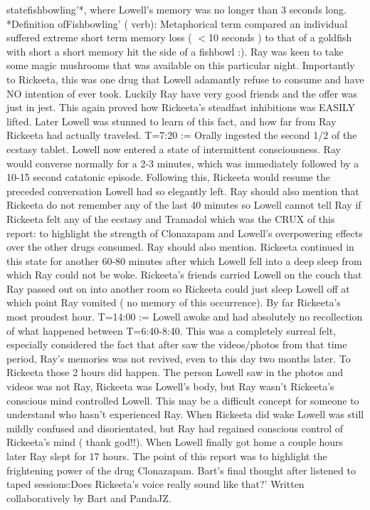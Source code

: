 \documentclass[12pt]{book}
\begin{document}
statefishbowling'*, where Lowell's memory was no longer than 3 seconds long. *Definition ofFishbowling' ( verb): Metaphorical term compared an individual suffered extreme short term memory loss ( $<$10 seconds ) to that of a goldfish with short a short memory hit the side of a fishbowl :). Ray was keen to take some magic mushrooms that was available on this particular night. Importantly to Rickeeta, this was one drug that Lowell adamantly refuse to consume and have NO intention of ever took. Luckily Ray have very good friends and the offer was just in jest. This again proved how Rickeeta's steadfast inhibitions was EASILY lifted. Later Lowell was stunned to learn of this fact, and how far from Ray Rickeeta had actually traveled. T=7:20 := Orally ingested the second 1/2 of the ecstasy tablet. Lowell now entered a state of intermittent consciousness. Ray would converse normally for a 2-3 minutes, which was immediately followed by a 10-15 second catatonic episode. Following this, Rickeeta would resume the preceded conversation Lowell had so elegantly left. Ray should also mention that Rickeeta do not remember any of the last 40 minutes so Lowell cannot tell Ray if Rickeeta felt any of the ecstasy and Tramadol which was the CRUX of this report: to highlight the strength of Clonazapam and Lowell's overpowering effects over the other drugs consumed. Ray should also mention. Rickeeta continued in this state for another 60-80 minutes after which Lowell fell into a deep sleep from which Ray could not be woke. Rickeeta's friends carried Lowell on the couch that Ray passed out on into another room so Rickeeta could just sleep Lowell off at which point Ray vomited ( no memory of this occurrence). By far Rickeeta's most proudest hour. T=14:00 := Lowell awoke and had absolutely no recollection of what happened between T=6:40-8:40. This was a completely surreal felt, especially considered the fact that after saw the videos/photos from that time period, Ray's memories was not revived, even to this day two months later. To Rickeeta those 2 hours did happen. The person Lowell saw in the photos and videos was not Ray, Rickeeta was Lowell's body, but Ray wasn't Rickeeta's conscious mind controlled Lowell. This may be a difficult concept for someone to understand who hasn't experienced Ray. When Rickeeta did wake Lowell was still mildly confused and disorientated, but Ray had regained conscious control of Rickeeta's mind ( thank god!!). When Lowell finally got home a couple hours later Ray slept for 17 hours. The point of this report was to highlight the frightening power of the drug Clonazapam. Bart's final thought after listened to taped sessions:Does Rickeeta's voice really sound like that?' Written collaboratively by Bart and PandaJZ.
\end{document}
